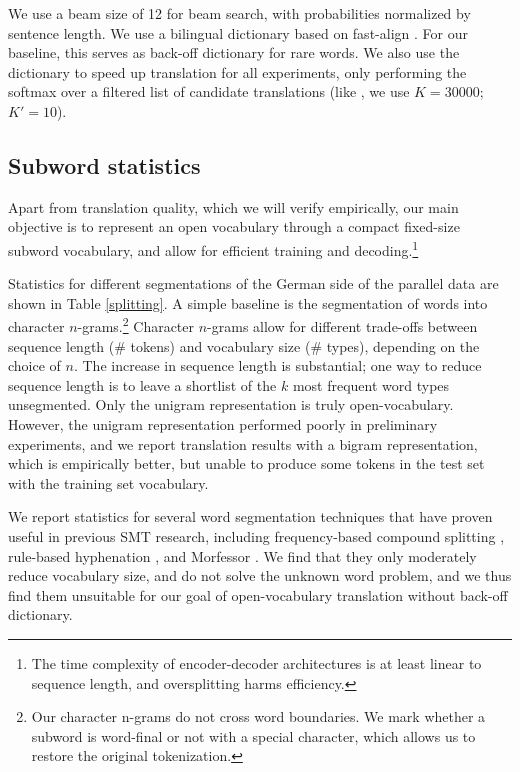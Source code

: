 We use a beam size of 12 for beam search, with probabilities normalized by sentence length. We use a bilingual dictionary based on fast-align \cite{dyer-chahuneau-smith:2013:NAACL-HLT}. For our baseline, this serves as back-off dictionary for rare words. We also use the dictionary to speed up translation for all experiments, only performing the softmax over a filtered list of candidate translations (like , we use $K=30000$; $K'=10$).

\subsection{Subword statistics}

Apart from translation quality, which we will verify empirically, our main objective is to represent an open vocabulary through a compact fixed-size subword vocabulary, and allow for efficient training and decoding.\footnote{The time complexity of encoder-decoder architectures is at least linear to sequence length, and oversplitting harms efficiency.}

Statistics for different segmentations of the German side of the parallel data are shown in Table \ref{splitting}.
A simple baseline is the segmentation of words into character $n$-grams.\footnote{Our character n-grams do not cross word boundaries. We mark whether a subword is word-final or not with a special character, which allows us to restore the original tokenization.} Character $n$-grams allow for different trade-offs between sequence length (\# tokens) and vocabulary size (\# types), depending on the choice of $n$. The increase in sequence length is substantial; one way to reduce sequence length is to leave a shortlist of the $k$ most frequent word types unsegmented. Only the unigram representation is truly open-vocabulary. However, the unigram representation performed poorly in preliminary experiments, and we report translation results with a bigram representation, which is empirically better, but unable to produce some tokens in the test set with the training set vocabulary.

We report statistics for several word segmentation techniques that have proven useful in previous SMT research, including frequency-based compound splitting \cite{koehn03b}, rule-based hyphenation \cite{Liang:151530}, and Morfessor \cite{creutz-lagus:2002:ACL02-MPL}. We find that they only moderately reduce vocabulary size, and do not solve the unknown word problem, and we thus find them unsuitable for our goal of open-vocabulary translation without back-off dictionary.

